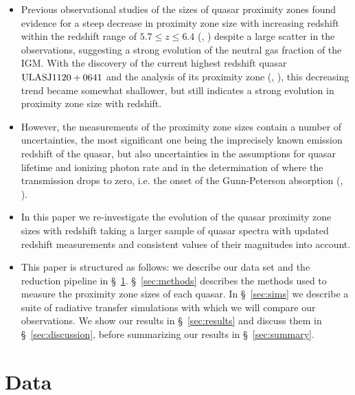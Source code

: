 \documentclass[iop]{emulateapj}
\begin{document}
\begin{itemize}
\item Previous observational studies of the sizes of quasar proximity zones found evidence for a steep decrease in proximity zone size with increasing redshift within the redshift range of $5.7\leq z\leq 6.4$ (\citet{Fan2006}, \citet{Carilli2010}) despite a large scatter in the observations, suggesting a strong evolution of the neutral gas fraction of the IGM. With the discovery of the current highest redshift quasar $\rm ULAS J1120+0641$\citep{Mortlock2011} and the analysis of its proximity zone (\citet{Venemans2015}, \citet{Bosman2015}), this decreasing trend became somewhat shallower, but still indicates a strong evolution in proximity zone size with redshift. 
\item However, the measurements of the proximity zone sizes contain a number of uncertainties, the most significant one being the imprecisely known emission redshift of the quasar, but also uncertainties in the assumptions for quasar lifetime and ionizing photon rate and in the determination of where the transmission drops to zero, i.e. the onset of the Gunn-Peterson absorption (\citet{Fan2006}, \citet{Carilli2010}). 
\item In this paper we re-investigate the evolution of the quasar proximity zone sizes with redshift taking a larger sample of quasar spectra with updated redshift measurements and consistent values of their magnitudes into account. 
\item This paper is structured as follows: we describe our data set and the reduction pipeline in \S~\ref{sec:data}. \S~\ref{sec:methods} describes the methods used to measure the proximity zone sizes of each quasar. In \S~\ref{sec:sims} we describe a suite of radiative transfer simulations with which we will compare our observations. We show our results in \S~\ref{sec:results} and discuss them in \S~\ref{sec:discussion}, before summarizing our results in \S~\ref{sec:summary}. 
\end{itemize}


\section{Data}\label{sec:data}
\end{document}
